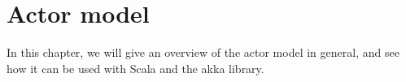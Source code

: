 \chapter{Actor model}
\label{chap:actor-model}
%
In this chapter, we will give an overview of the actor model in general, and 
see how it can be used with Scala and the akka library.
%

%
